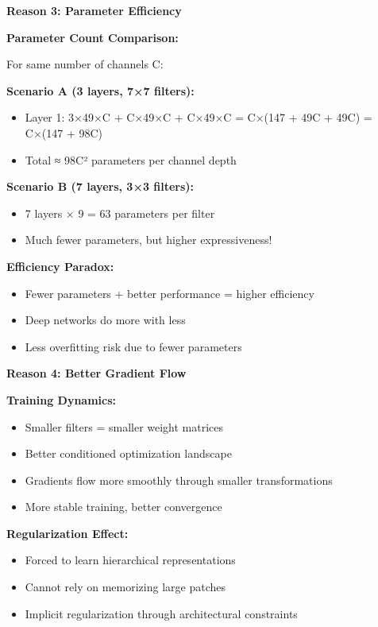 \documentclass[12pt]{article}
\newcommand{\explanation}[1]{{\color{explanationcolor}#1}}
\begin{document}
\begin{enumerate}[(a)]
{    \textbf{Reason 3: Parameter Efficiency}
    
    \explanation{
    \textbf{Parameter Count Comparison:}
    
    For same number of channels C:
    
    \textbf{Scenario A (3 layers, 7×7 filters):}
    \begin{itemize}
        \item Layer 1: 3×49×C + C×49×C + C×49×C = C×(147 + 49C + 49C) = C×(147 + 98C)
        \item Total ≈ 98C² parameters per channel depth
    \end{itemize}
    
    \textbf{Scenario B (7 layers, 3×3 filters):}
    \begin{itemize}
        \item 7 layers × 9 = 63 parameters per filter
        \item Much fewer parameters, but higher expressiveness!
    \end{itemize}
    
    \textbf{Efficiency Paradox:}
    \begin{itemize}
        \item Fewer parameters + better performance = higher efficiency
        \item Deep networks do more with less
        \item Less overfitting risk due to fewer parameters
    \end{itemize}
    }
    
    \textbf{Reason 4: Better Gradient Flow}
    
    \explanation{
    \textbf{Training Dynamics:}
    \begin{itemize}
        \item Smaller filters = smaller weight matrices
        \item Better conditioned optimization landscape
        \item Gradients flow more smoothly through smaller transformations
        \item More stable training, better convergence
    \end{itemize}
    
    \textbf{Regularization Effect:}
    \begin{itemize}
        \item Forced to learn hierarchical representations
        \item Cannot rely on memorizing large patches
        \item Implicit regularization through architectural constraints
    \end{itemize}
    }
    
}
\end{enumerate}
\end{document}
